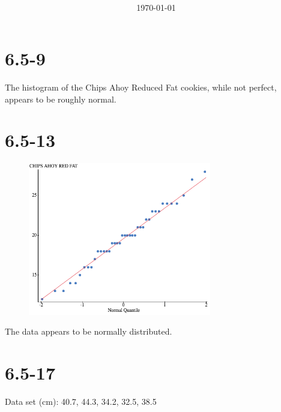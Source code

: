 \documentclass[12pt,fleqn]{article}
\title{\classdescription\ \\ \classname\ \\ $\ $ \\ \assignment}
\author{\authorname}
\date{\today}
\newcommand{\chapter}{6.5}
\newcommand{\problem}[1]{\vspace{5ex}\section*{\chapter-#1}}
\begin{document}
\maketitle


\problem{9}
The histogram of the Chips Ahoy Reduced Fat cookies, while not perfect, appears to be roughly normal.


\problem{13}
\begin{figure}[ht]
  \centering
  \includegraphics[width=8cm]{assets/cookies-qq.png}
\end{figure}
The data appears to be normally distributed.


\problem{17}
Data set (cm): 40.7, 44.3, 34.2, 32.5, 38.5
\end{document}
